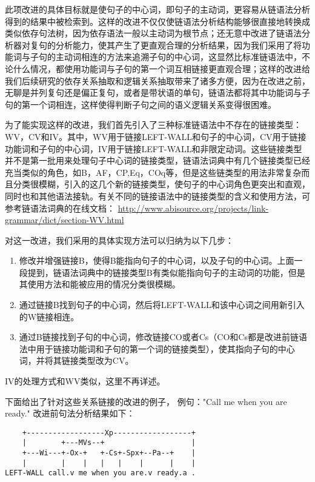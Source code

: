 此项改进的具体目标就是使句子的中心词，即句子的主动词，更容易从链语法分析得到的结果中被检索到。这样的改进不仅仅使链语法分析结构能够很直接地转换成类似依存句法树，因为依存语法一般以主动词为根节点；还无意中改进了链语法分析器对复句的分析能力，使其产生了更直观合理的分析结果，因为我们采用了将功能词与子句的主动词相连的方法来追溯子句的中心词，这显然比标准链语法中，不论什么情况，都使用功能词与子句的第一个词互相链接更直观合理；这样的改进给我们后续研究的依存关系抽取和逻辑关系抽取带来了诸多方便，因为在改进之前，无聊是并列复句还是偏正复句，或者是带状语的单句，链语法都将其中功能词与子句的第一个词相连，这样使得判断子句之间的语义逻辑关系变得很困难。

为了能实现这样的改进，我们首先引入了三种标准链语法中不存在的链接类型：WV，CV和IV。其中，WV用于链接LEFT-WALL和句子的中心词，CV用于链接功能词和子句的中心词，IV用于链接LEFT-WALL和非限定动词。这些链接类型并不是第一批用来处理句子中心词的链接类型，链语法词典中有几个链接类型已经充当类似的角色，如B，AF，CP,Eq，COq等，但是这些链类型的用法非常复杂而且分类很模糊，引入的这几个新的链接类型，使句子的中心词角色更突出和直观，同时也和其他语法接轨。有关不同的链接语法中的链接类型的含义和使用方法，可参考链语法词典的在线文档： \url{http://www.abisource.org/projects/link-grammar/dict/section-WV.html}

对这一改进，我们采用的具体实现方法可以归纳为以下几步：
\begin{enumerate}
\item 修改并增强链接B，使得B能指向句子的中心词，以及子句的中心词。上面一段提到，链语法词典中的链接类型B有类似能指向句子的主动词的功能，但是其使用方法和能被应用的情况分类很模糊。
\item 通过链接B找到句子的中心词，然后将LEFT-WALL和该中心词之间用新引入的W链接相连。
\item 通过B链接找到子句的中心词，修改链接CO或者Cs（CO和Cs都是改进前链语法中用于链接功能词和子句的第一个词的链接类型），使其指向子句的中心词，并将其链接类型改为CV。
\end{enumerate}

IV的处理方式和WV类似，这里不再详述。

下面给出了针对这些关系链接的改进的例子，
例句："Call me when you are ready."
改进前句法分析结果如下：
\begin{verbatim}
    +------------------Xp------------------+
    |        +---MVs--+                    |
    +---Wi---+-Ox-+   +-Cs+-Spx+--Pa--+    |
    |        |    |   |   |    |      |    |
LEFT-WALL call.v me when you are.v ready.a .
\end{verbatim}

